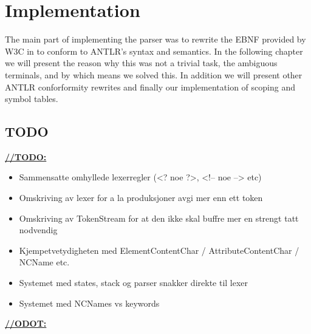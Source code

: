 \chapter{Implementation}

The main part of implementing the parser was to rewrite the EBNF provided by W3C 
in \cite{w3c01} to conform to ANTLR's syntax and semantics. In the following chapter
we will present the reason why this was not a trivial task, the ambiguous 
terminals, and by which means we solved this. In addition we will present other 
ANTLR conforformity rewrites and finally our implementation of scoping and symbol
tables.






\section{TODO}

\underline{\textbf{\LARGE //TODO:}}
\begin{itemize}
\item Sammensatte omhyllede lexerregler (<? noe ?>, <!-- noe --> etc)
\item Omskriving av lexer for a la produksjoner avgi mer enn ett token
\item Omskriving av TokenStream for at den ikke skal buffre mer en strengt tatt nodvendig
\item Kjempetvetydigheten med ElementContentChar / AttributeContentChar / NCName etc.
\item Systemet med states, stack og parser snakker direkte til lexer
\item Systemet med NCNames vs keywords
\end{itemize}

\underline{\textbf{\LARGE //ODOT:}}